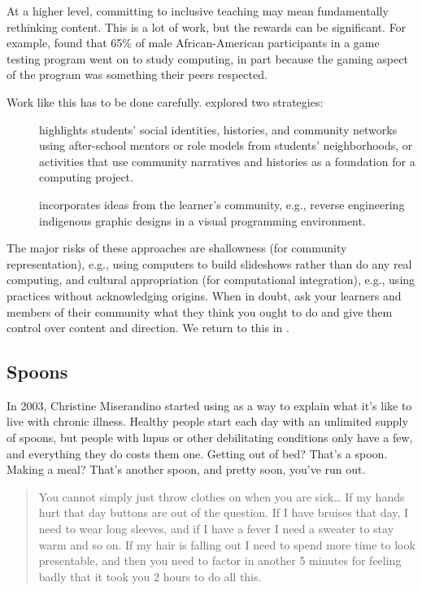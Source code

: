 At a higher level, committing to inclusive teaching may mean
fundamentally rethinking content. This is a lot of work, but the rewards
can be significant. For example, \cite{DiSa2014a} found that 65\% of
male African-American participants in a game testing program went on to
study computing, in part because the gaming aspect of the program was
something their peers respected.

Work like this has to be done carefully. \cite{Lach2018} explored two
strategies:

\begin{description}
\item[{}]
highlights students' social identities, histories, and community
networks using after-school mentors or role models from students'
neighborhoods, or activities that use community narratives and
histories as a foundation for a computing project.
\item[{}]
incorporates ideas from the learner's community, e.g., reverse
engineering indigenous graphic designs in a visual programming
environment.
\end{description}

The major risks of these approaches are shallowness (for community
representation), e.g., using computers to build slideshows rather than
do any real computing, and cultural appropriation (for computational
integration), e.g., using practices without acknowledging origins. When
in doubt, ask your learners and members of their community what they
think you ought to do and give them control over content and direction.
We return to this in .

\subsection*{Spoons}

In 2003, Christine Miserandino started using
 as a way to explain what it's like to
live with chronic illness. Healthy people start each day with an
unlimited supply of spoons, but people with lupus or other
debilitating conditions only have a few, and everything they do costs
them one. Getting out of bed? That's a spoon. Making a meal? That's
another spoon, and pretty soon, you've run out.

\begin{quote}

You cannot simply just throw clothes on when you are
sick{\ldots} If my hands hurt that day buttons are out of the
question. If I have bruises that day, I need to wear long sleeves, and
if I have a fever I need a sweater to stay warm and so on. If my hair
is falling out I need to spend more time to look presentable, and then
you need to factor in another 5 minutes for feeling badly that it took
you 2 hours to do all this.

\end{quote}

